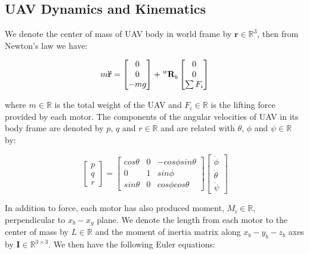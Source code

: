 \subsection{UAV Dynamics and Kinematics}

We denote the center of mass of UAV body in world frame by $\mathbf{r}\in\mathbb{R}^3$, then from Newton's law we have:

\begin{equation}\label{eq:newton}
m\mathbf{\ddot{r}}=\begin{bmatrix}0\\0\\-mg\end{bmatrix}+\tensor*[^w]{\mathbf{R}}{_b}\begin{bmatrix}0\\0\\\sum F_i\end{bmatrix}
\end{equation}

where $\mathit{m}\in\mathbb{R}$ is the total weight of the UAV and $\mathit{F_i}\in\mathbb{R}$ is the lifting force provided by each motor. The components of the angular velocities of UAV in its body frame are denoted by $\mathit{p}$, $\mathit{q}$ and $\mathit{r}\in\mathbb{R}$ and are related with $\theta$, $\phi$ and $\psi\in\mathbb{R}$ by:

\begin{equation}\label{eq:pqr}
\begin{bmatrix}p\\q\\r\end{bmatrix}=\begin{bmatrix}cos\theta&0&-cos\phi sin\theta\\0&1&sin\phi\\sin\theta&0&cos\phi cos\theta\end{bmatrix}\begin{bmatrix}\dot{\phi}\\\dot{\theta}\\\dot{\psi}\end{bmatrix}
\end{equation}

In addition to force, each motor has also produced moment, $\mathit{M_i}\in\mathbb{R}$, perpendicular to $x_b-x_y$ plane. We denote the length from each motor to the center of mass by $\mathit{L}\in\mathbb{R}$ and the moment of inertia matrix along $x_b-y_b-z_b$ axes by $\mathbf{I}\in\mathbb{R}^{3\times3}$. We then have the following Euler equations:

